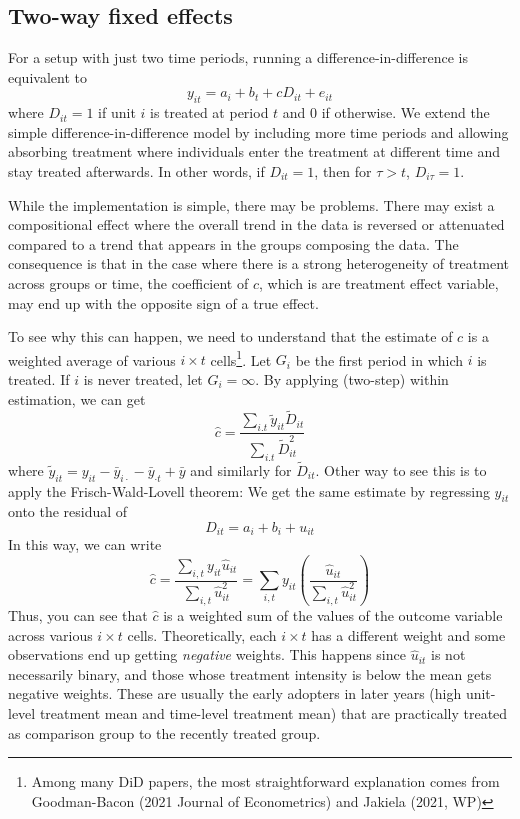 \documentclass[12pt]{article}
\theoremstyle{definition}
\theoremstyle{property}
\theoremstyle{assumption}
\theoremstyle{example}
\theoremstyle{comment}
\begin{document}
\subsection{Two-way fixed effects}
For a setup with just two time periods, running a difference-in-difference is equivalent to
\[
y_{it}=a_i+b_t + cD_{it}+e_{it}
\]
where $D_{it}=1$ if unit $i$ is treated at period $t$ and $0$ if otherwise. We extend the simple difference-in-difference model by including more time periods and allowing absorbing treatment where individuals enter the treatment at different time and stay treated afterwards. In other words, if $D_{it}=1$, then for $\tau>t$, $D_{i\tau}=1$. \par
While the implementation is simple, there may be problems. There may exist a compositional effect where the overall trend in the data is reversed or attenuated compared to a trend that appears in the groups composing the data. The consequence is that in the case where there is a strong heterogeneity of treatment across groups or time, the coefficient of $c$, which is are treatment effect variable, may end up with the opposite sign of a true effect. \par
To see why this can happen, we need to understand that the estimate of $c$ is a weighted average of various $i\times t$ cells\footnote{Among many DiD papers, the most straightforward explanation comes from Goodman-Bacon (2021 Journal of Econometrics) and Jakiela (2021, WP)}. Let $G_i$ be the first period in which $i$ is treated. If $i$ is never treated, let $G_i=\infty$. By applying (two-step) within estimation, we can get
\[
\hat{c} = \frac{\sum_{i.t}\tilde{y}_{it}\widetilde{D}_{it}}{\sum_{i.t}\widetilde{D}_{it}^2}
\]
where $\tilde{y}_{it}=y_{it}-\bar{y}_{i\cdot}-\bar{y}_{\cdot t}+\bar{y}$ and similarly for $\widetilde{D}_{it}$. Other way to see this is to apply the Frisch-Wald-Lovell theorem: We get the same estimate by regressing $y_{it}$ onto the residual of 
\[
D_{it} = a_i+b_i+u_{it} 
\]
In this way, we can write
\[
\hat{c}=\frac{\sum_{i,t}y_{it}\hat{u}_{it}}{\sum_{i,t}\hat{u}_{it}^2}=\sum_{i,t}y_{it}\left(\frac{\hat{u}_{it}}{\sum_{i,t}\hat{u}_{it}^2}\right)
\]
Thus, you can see that $\hat{c}$ is a weighted sum of the values of the outcome variable across various $i\times t$ cells. Theoretically, each $i\times t$ has a different weight and some observations end up getting \textit{negative} weights. This happens since $\hat{u}_{it}$ is not necessarily binary, and those whose treatment intensity is below the mean gets negative weights. These are usually the early adopters in later years (high unit-level treatment mean and time-level treatment mean) that are practically treated as comparison group to the recently treated group.  
\end{document}
